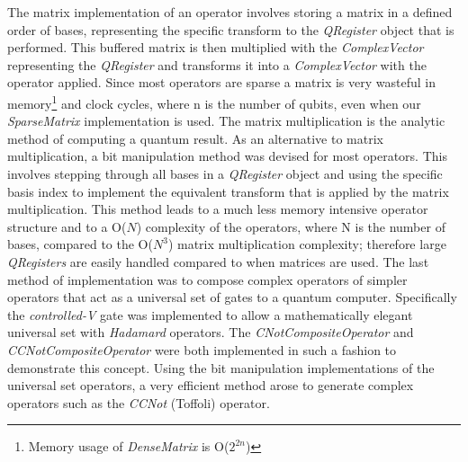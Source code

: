 The matrix implementation of an operator involves storing a matrix in a defined order of bases, representing the specific transform to the \emph{QRegister} object that is performed. This buffered matrix is then multiplied with the \emph{ComplexVector} representing the \emph{QRegister} and transforms it into a \emph{ComplexVector} with the operator applied. Since most operators are sparse a matrix is very wasteful in memory\footnote{Memory usage of \emph{DenseMatrix} is O(\(2^{2n}\))} and clock cycles, where n is the number of qubits, even when our \emph{SparseMatrix} implementation is used. The matrix multiplication is the analytic method of computing a quantum result. As an alternative to matrix multiplication, a bit manipulation method was devised for most operators. This involves stepping through all bases in a \emph{QRegister} object and using the specific basis index to implement the equivalent transform that is applied by the matrix multiplication. This method leads to a much less memory intensive operator structure and to a O(\(N\)) complexity of the operators, where N is the number of bases, compared to the O(\(N^3\)) matrix multiplication complexity; therefore large \emph{QRegisters} are easily handled compared to when matrices are used. The last method of implementation was to compose complex operators of simpler operators that act as a universal set of gates to a quantum computer. Specifically the \emph{controlled-V} gate was implemented to allow a mathematically elegant universal set with \emph{Hadamard} operators\cite{ekert2000}. The \emph{CNotCompositeOperator} and \emph{CCNotCompositeOperator} were both implemented in such a fashion to demonstrate this concept. Using the bit manipulation implementations of the universal set operators, a very efficient method arose to generate complex operators such as the \emph{CCNot} (Toffoli) operator. 
